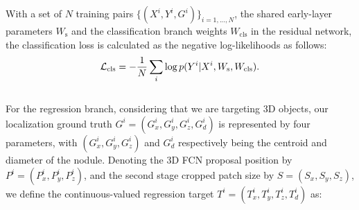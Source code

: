 \documentclass{llncs}
\begin{document}
With a set of $N$ training pairs $\{(X^i, Y^i, G^i)\}_{i=1,...,N}$, the shared early-layer parameters $W_\text{s}$ and the classification branch weights $W_\text{cls}$ in the residual network, the classification loss is calculated as the negative log-likelihoods as follows:
\vspace{-2mm}
\begin{equation}
\vspace{-1mm}
\mathcal{L}_{\text{cls}} = - \frac{1}{N}\sum_i\log p(Y^i|X^i,W_\text{s},W_\text{cls}).
\end{equation}
\vspace{-3mm}
\\
For the regression branch, considering that we are targeting 3D objects, our localization ground truth $G^i=(G^i_x,G^i_y,G^i_z,G^i_d)$ is represented by four parameters, with $(G^i_x, G^i_y, G^i_z)$ and $G^i_d$ respectively being the centroid and diameter of the nodule.
Denoting the 3D FCN proposal position by $P^i=(P^i_x,P^i_y,P^i_z)$, and the second stage cropped patch size by $S=(S_x, S_y, S_z)$, we define the continuous-valued regression target $T^i=(T_x^i, T_y^i, T_z^i, T_d^i)$ as:
\end{document}
